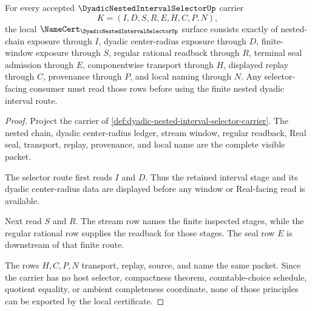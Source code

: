 \begin{theorem}
\label{thm:dyadic-nested-interval-selector-namecert-obligations}
For every accepted $\DyadicNestedIntervalSelectorUp$ carrier
$$
K=(I,D,S,R,E,H,C,P,N),
$$
the local $\NameCert_{\DyadicNestedIntervalSelectorUp}$ surface consists exactly of nested-chain exposure through $I$, dyadic center-radius exposure through $D$, finite-window exposure through $S$, regular rational readback through $R$, terminal seal admission through $E$, componentwise transport through $H$, displayed replay through $C$, provenance through $P$, and local naming through $N$. Any selector-facing consumer must read those rows before using the finite nested dyadic interval route.
\end{theorem}
\begin{proof}
Project the carrier of \autoref{def:dyadic-nested-interval-selector-carrier}. The nested chain, dyadic center-radius ledger, stream window, regular readback, Real seal, transport, replay, provenance, and local name are the complete visible packet.

The selector route first reads $I$ and $D$. Thus the retained interval stage and its dyadic center-radius data are displayed before any window or Real-facing read is available.

Next read $S$ and $R$. The stream row names the finite inspected stages, while the regular rational row supplies the readback for those stages. The seal row $E$ is downstream of that finite route.

The rows $H,C,P,N$ transport, replay, source, and name the same packet. Since the carrier has no host selector, compactness theorem, countable-choice schedule, quotient equality, or ambient completeness coordinate, none of those principles can be exported by the local certificate.
\end{proof}

